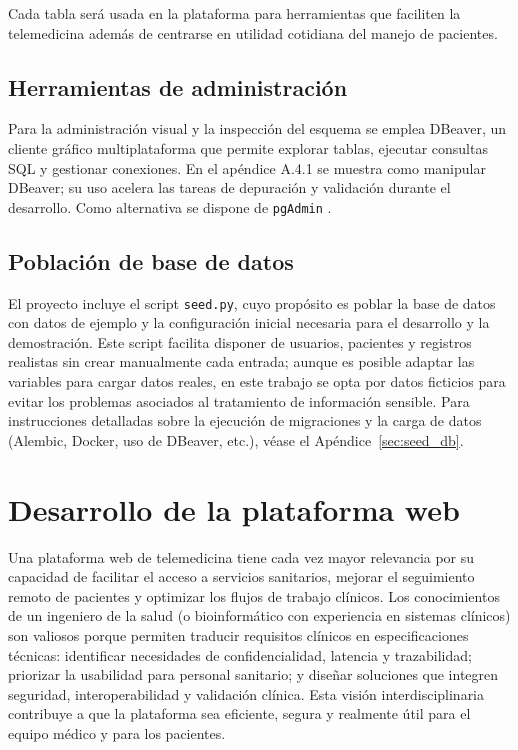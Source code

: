\documentclass[12pt, a4paper]{article}
\begin{document}
Cada tabla será usada en la plataforma para herramientas que faciliten la telemedicina además de centrarse en utilidad cotidiana del manejo de pacientes.



\subsection{Herramientas de administración}

Para la administración visual y la inspección del esquema se emplea DBeaver, un cliente gráfico multiplataforma que permite explorar tablas, ejecutar consultas SQL y gestionar conexiones. En el apéndice A.4.1 se muestra como manipular DBeaver; su uso acelera las tareas de depuración y validación durante el desarrollo. Como alternativa se dispone de \texttt{pgAdmin} \cite{dbeaver_doc,postgresql_doc}.


\subsection{Población de base de datos}

El proyecto incluye el script \texttt{seed.py}, cuyo propósito es poblar la base de datos con datos de ejemplo y la configuración inicial necesaria para el desarrollo y la demostración. Este script facilita disponer de usuarios, pacientes y registros realistas sin crear manualmente cada entrada; aunque es posible adaptar las variables para cargar datos reales, en este trabajo se opta por datos ficticios para evitar los problemas asociados al tratamiento de información sensible. Para instrucciones detalladas sobre la ejecución de migraciones y la carga de datos (Alembic, Docker, uso de DBeaver, etc.), véase el Apéndice~\ref{sec:seed_db}.


\section{Desarrollo de la plataforma web}


Una plataforma web de telemedicina tiene cada vez mayor relevancia por su capacidad de facilitar el acceso a servicios sanitarios, mejorar el seguimiento remoto de pacientes y optimizar los flujos de trabajo clínicos. Los conocimientos de un ingeniero de la salud (o bioinformático con experiencia en sistemas clínicos) son valiosos porque permiten traducir requisitos clínicos en especificaciones técnicas: identificar necesidades de confidencialidad, latencia y trazabilidad; priorizar la usabilidad para personal sanitario; y diseñar soluciones que integren seguridad, interoperabilidad y validación clínica. Esta visión interdisciplinaria contribuye a que la plataforma sea eficiente, segura y realmente útil para el equipo médico y para los pacientes.
\end{document}
